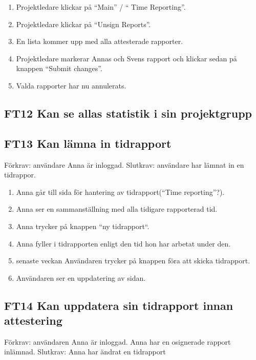 \documentclass[paper=a4, fontsize=11pt,twoside]{article}
\begin{document}
		\begin{enumerate}
		 \item Projektledare klickar på “Main” / “ Time Reporting”.
		 \item Projektledare klickar på “Unsign Reports”.
		 \item En lista kommer upp med alla attesterade rapporter.
		 \item Projektledare markerar Annas och Svens rapport och klickar sedan på
		 knappen “Submit changes”.
		  \item Valda rapporter har nu annulerats.
		  
		\end{enumerate}
		
		\subsection*{FT12 Kan se allas statistik i sin projektgrupp}
		
		\subsection*{FT13 Kan lämna in tidrapport}
		
		Förkrav: användare Anna är inloggad.
		\newline 
		Slutkrav: användare har lämnat in en tidrappor.
		
		\begin{enumerate}
		  \item Anna går till sida för hantering av tidrapport(“Time reporting”?).
			\item Anna ser en sammanställning med alla tidigare rapporterad tid.
			\item Anna trycker på knappen “ny tidrapport“.
			\item Anna fyller i tidrapporten enligt den tid hon har arbetat under den.
			\item senaste veckan Användaren trycker på knappen föra att skicka
			tidrapport.
			\item Användaren ser en uppdatering av sidan.
		  
		\end{enumerate}
		
		\subsection*{FT14 Kan uppdatera sin tidrapport innan attestering}
		
		Förkrav: användaren Anna är inloggad. Anna har en osignerade rapport inlämnad. 
		\newline
		Slutkrav: Anna har ändrat en tidrapport
		
\end{document}
